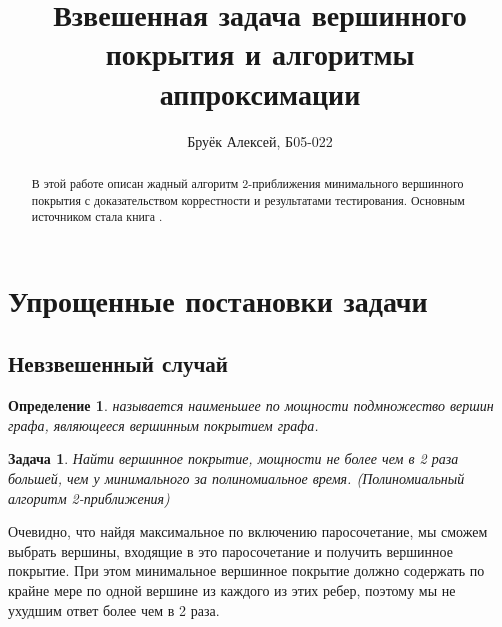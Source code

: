 \documentclass{article}
\title{Взвешенная задача вершинного покрытия и алгоритмы аппроксимации}
\author{Бруёк Алексей, Б05-022}
\date{}
\newtheorem{definition}{Определение}
\newtheorem{task}{Задача}
\theoremstyle{definition}
\begin{document}
	\maketitle
  \begin{abstract}
    В этой работе описан жадный алгоритм $2$-приближения минимального вершинного покрытия
    с доказательством коррестности и результатами тестирования. 
    Основным источником стала книга \cite{main_source}.
  \end{abstract}
  \section{Упрощенные постановки задачи}
  \subsection{Невзвешенный случай}
  \begin{definition}
     называется наименьшее 
    по мощности подмножество вершин графа, являющееся вершинным покрытием графа.
  \end{definition}
  \begin{task}
    Найти вершинное покрытие, мощности не более чем в 2 раза большей, 
    чем у минимального за полиномиальное время. (Полиномиальный алгоритм 2-приближения)
  \end{task}
  Очевидно, что найдя максимальное по включению паросочетание, 
  мы сможем выбрать вершины, входящие в это паросочетание и получить вершинное покрытие.
  При этом минимальное вершинное покрытие должно содержать по крайне мере по одной вершине
  из каждого из этих ребер, поэтому мы не ухудшим ответ более чем в 2 раза.
\end{document}
